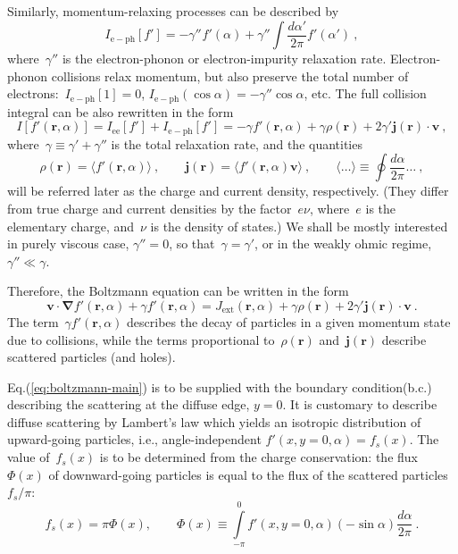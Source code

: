 \documentclass[preprint,aps,eqsecnum]{revtex4-1}
\begin{document}
Similarly, momentum-relaxing processes can be described by
\begin{equation}
I_\mathrm{e-ph}[f'] = - \gamma'' _\mathrm{} f'(\alpha)
  + \gamma'' \int \frac{d\alpha'}{2\pi} f'(\alpha')
\ ,
\end{equation}
where~$\gamma''$ is the electron-phonon or electron-impurity relaxation rate.
Electron-phonon collisions relax momentum, but also preserve
the total number of electrons:~$I_\mathrm{e-ph}[1] = 0$,
$I_\mathrm{e-ph}(\cos\alpha) = - \gamma'' \cos\alpha$, etc.
The full collision integral can be also rewritten
in the form
\begin{equation}
  \label{eq:collision-integral}
  I[f'({\bm r}, \alpha)] = I_\mathrm{ee}[f'] + I_\mathrm{e-ph}[f'] =  -\gamma f'({\bm r}, \alpha)
  + \gamma \rho({\bm r}) + 2 \gamma' {\bm j}({\bm r}) \cdot {\bm v}
 \ ,
\end{equation}
where~$\gamma \equiv \gamma' + \gamma''$ is the total relaxation
rate, and the quantities
\begin{equation}
  \label{eq:rho-and-j}
  \rho({\bm r}) = \langle f'({\bm r}, \alpha) \rangle
  \ , \qquad
  {\bm j}({\bm r}) = \langle f'({\bm r}, \alpha) {\bm v} \rangle
  \ , \qquad
  \langle \dots \rangle \equiv \oint \frac{d\alpha}{2\pi} \dots
  \ ,
\end{equation}
will be referred later as the charge and current density, respectively.
(They differ from true charge and current densities by the factor~$e \nu$,
where~$e$ is the elementary charge, and~$\nu$ is the density of states.)
We shall be mostly interested in purely viscous case,
$\gamma'' = 0$, so that~$\gamma = \gamma'$, or in the weakly ohmic
regime, $\gamma'' \ll \gamma$.

Therefore, the Boltzmann equation can be written in the form
\begin{equation}
  \label{eq:boltzmann-main}
  {\bm v} \cdot{\bm \nabla }f'({\bm r}, \alpha) + \gamma f'({\bm r}, \alpha) =
  J_\mathrm{ext}({\bm r}, \alpha) + \gamma \rho({\bm r})
  + 2 \gamma' {\bm j}({\bm r}) \cdot {\bm v}
  \ .
\end{equation}
The term~$\gamma f'(\bm r, \alpha)$
describes the decay of particles in a given momentum state due to collisions,
while the terms proportional to~$\rho({\bm r})$ and~${\bm j}({\bm r})$
describe scattered particles (and holes).


Eq.(\ref{eq:boltzmann-main})
is to be supplied with the boundary condition(b.c.) describing
the scattering at the diffuse edge, $y = 0$.
It is customary to describe diffuse
scattering by Lambert's law which yields an isotropic
distribution of upward-going particles, i.e., angle-independent
\mbox{$f'(x, y=0, \alpha) = f_s(x)$}.
The value of~$f_s(x)$ is to be determined from the charge conservation:
the flux~$\Phi(x)$ of downward-going particles is equal
to the flux of the scattered particles $f_s / \pi$:
\begin{equation}
  \label{eq:lambert-bc}
  f_s(x) = \pi \Phi(x),  \qquad
  \Phi (x) \equiv \int\limits_{-\pi}^{0} f'(x, y = 0, \alpha)
  (-\sin \alpha) \frac{d\alpha}{2\pi} \ .
\end{equation}
\end{document}
